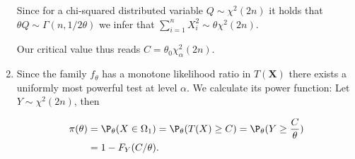 \begin{solution}
\begin{enumerate}[label = (\alph*)]
  Since for a chi-squared distributed variable $Q \sim \chi^2(2n)$ it holds
  that $\theta Q \sim \Gamma(n, 1/2\theta)$ we infer that $\sum_{i=1}^n X_i^2 \sim \theta \chi^2(2n)$.

  Our critical value thus reads $C = \theta_0 \chi^2_{\alpha}(2n)$.

  \item Since the family $f_\theta$ has a monotone likelihood ratio in $T(\textbf{X})$ there exists
  a uniformly most powerful test at level $\alpha$.
  We calculate its power function: Let $Y \sim \chi^2(2n)$, then

  \begin{align*}
    \pi(\theta) &= \P_\theta(X \in \Omega_1) = \P_\theta(T(X) \geq C)
    = \P_\theta(Y \geq \frac{C}{\theta}) \\
    &= 1 - F_{Y}(C/\theta).
  \end{align*}
\end{enumerate}

\end{solution}


